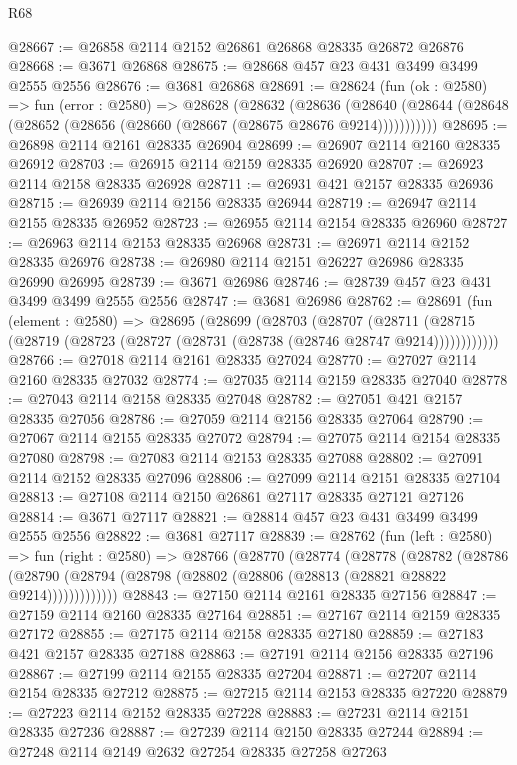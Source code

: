 \begin{lexlean}{R68}
\begin{coremodule}
@28667 := @26858 @2114 @2152 @26861 @26868 @28335 @26872 @26876
@28668 := @3671 @26868
@28675 := @28668 @457 @23 @431 @3499 @3499 @2555 @2556
@28676 := @3681 @26868
@28691 := @28624
    (fun (ok : @2580) =>
    fun (error : @2580) =>
    @28628
      (@28632
        (@28636
          (@28640 (@28644 (@28648 (@28652 (@28656 (@28660 (@28667 (@28675 @28676 @9214)))))))))))
@28695 := @26898 @2114 @2161 @28335 @26904
@28699 := @26907 @2114 @2160 @28335 @26912
@28703 := @26915 @2114 @2159 @28335 @26920
@28707 := @26923 @2114 @2158 @28335 @26928
@28711 := @26931 @421 @2157 @28335 @26936
@28715 := @26939 @2114 @2156 @28335 @26944
@28719 := @26947 @2114 @2155 @28335 @26952
@28723 := @26955 @2114 @2154 @28335 @26960
@28727 := @26963 @2114 @2153 @28335 @26968
@28731 := @26971 @2114 @2152 @28335 @26976
@28738 := @26980 @2114 @2151 @26227 @26986 @28335 @26990 @26995
@28739 := @3671 @26986
@28746 := @28739 @457 @23 @431 @3499 @3499 @2555 @2556
@28747 := @3681 @26986
@28762 := @28691
    (fun (element : @2580) =>
    @28695
      (@28699
        (@28703
          (@28707
            (@28711 (@28715 (@28719 (@28723 (@28727 (@28731 (@28738 (@28746 @28747 @9214))))))))))))
@28766 := @27018 @2114 @2161 @28335 @27024
@28770 := @27027 @2114 @2160 @28335 @27032
@28774 := @27035 @2114 @2159 @28335 @27040
@28778 := @27043 @2114 @2158 @28335 @27048
@28782 := @27051 @421 @2157 @28335 @27056
@28786 := @27059 @2114 @2156 @28335 @27064
@28790 := @27067 @2114 @2155 @28335 @27072
@28794 := @27075 @2114 @2154 @28335 @27080
@28798 := @27083 @2114 @2153 @28335 @27088
@28802 := @27091 @2114 @2152 @28335 @27096
@28806 := @27099 @2114 @2151 @28335 @27104
@28813 := @27108 @2114 @2150 @26861 @27117 @28335 @27121 @27126
@28814 := @3671 @27117
@28821 := @28814 @457 @23 @431 @3499 @3499 @2555 @2556
@28822 := @3681 @27117
@28839 := @28762
    (fun (left : @2580) =>
    fun (right : @2580) =>
    @28766
      (@28770
        (@28774
          (@28778
            (@28782
              (@28786
                (@28790 (@28794 (@28798 (@28802 (@28806 (@28813 (@28821 @28822 @9214)))))))))))))
@28843 := @27150 @2114 @2161 @28335 @27156
@28847 := @27159 @2114 @2160 @28335 @27164
@28851 := @27167 @2114 @2159 @28335 @27172
@28855 := @27175 @2114 @2158 @28335 @27180
@28859 := @27183 @421 @2157 @28335 @27188
@28863 := @27191 @2114 @2156 @28335 @27196
@28867 := @27199 @2114 @2155 @28335 @27204
@28871 := @27207 @2114 @2154 @28335 @27212
@28875 := @27215 @2114 @2153 @28335 @27220
@28879 := @27223 @2114 @2152 @28335 @27228
@28883 := @27231 @2114 @2151 @28335 @27236
@28887 := @27239 @2114 @2150 @28335 @27244
@28894 := @27248 @2114 @2149 @2632 @27254 @28335 @27258 @27263

\end{coremodule}
\end{lexlean}
